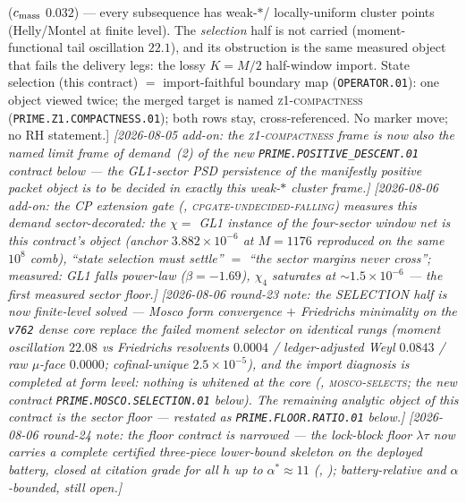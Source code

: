{{($c_{\rm mass}$ $0.032$) --- every subsequence has weak-$*$/%
locally-uniform cluster points (Helly/Montel at finite level).
The \emph{selection} half is not carried (moment-functional tail
oscillation $22.1$), and its obstruction is the same measured
object that fails the delivery legs: the lossy $K=M/2$ half-window
import.  State selection (this contract) $=$ import-faithful
boundary map (\texttt{OPERATOR.01}): one object viewed twice; the
merged target is named \textsc{z1-compactness}
(\texttt{PRIME.Z1.COMPACTNESS.01}); both rows stay,
cross-referenced.  No marker move; no RH statement.]}
\emph{[2026-08-05 add-on: the \textsc{z1-compactness} frame is now
also the named limit frame of demand~(2) of the new
\texttt{PRIME.POSITIVE\_DESCENT.01} contract below --- the
GL1-sector PSD persistence of the manifestly positive packet
object is to be decided in exactly this weak-$*$ cluster frame.]}
\emph{[2026-08-06 add-on: the CP extension gate
(,
\textsc{cpgate-undecided-falling}) measures this demand
\emph{sector-decorated}: the $\chi=$ GL1 instance of the
four-sector window net \emph{is} this contract's object (anchor
$3.882\times10^{-6}$ at $M=1176$ reproduced on the same $10^8$
comb), ``state selection must settle'' $=$ ``the sector margins
never cross''; measured: GL1 falls power-law ($\beta=-1.69$),
$\chi_4$ saturates at ${\sim}1.5\times10^{-6}$ --- the first
measured sector floor.]}
\emph{[2026-08-06 round-23 note: the SELECTION half is now
finite-level \emph{solved} --- Mosco form convergence $+$
Friedrichs minimality on the \texttt{v762} dense core replace the
failed moment selector on identical rungs (moment oscillation
$22.08$ vs Friedrichs resolvents $0.0004$ / ledger-adjusted Weyl
$0.0843$ / raw $\mu$-face $0.0000$; cofinal-unique
$2.5\times10^{-5}$), and the import diagnosis is completed at form
level: nothing is whitened at the core
(, \textsc{mosco-selects};
the new contract \texttt{PRIME.MOSCO.SELECTION.01} below).  The
remaining analytic object of this contract is the sector floor ---
restated as \texttt{PRIME.FLOOR.RATIO.01} below.]}
\emph{[2026-08-06 round-24 note: the floor contract is
\emph{narrowed} --- the lock-block floor $\lambda\tau$ now carries
a complete certified three-piece lower-bound skeleton on the
deployed battery, closed at citation grade for all $h$ up to
$\alpha^*\approx11$ (,
); battery-relative and
$\alpha$-bounded, still open.]}\par}



